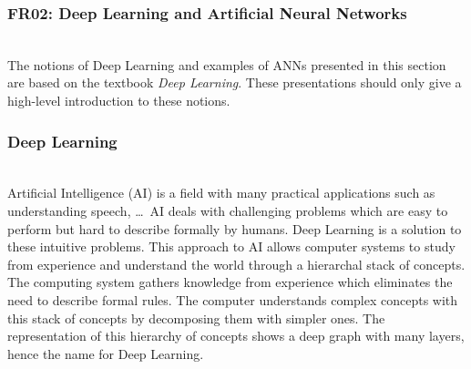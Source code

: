 
\subsubsection{FR02: Deep Learning and Artificial Neural Networks}\label{ann}~\\

The notions of Deep Learning and examples of ANNs presented in this section are
based on the textbook \textit{Deep Learning}\cite{Goodfellow-et-al-2016}. These
presentations should only give a high-level introduction to these notions.

\subsubsection{Deep Learning}~\\


Artificial Intelligence (AI) is a field with many practical applications such as
understanding speech, \dots \ AI deals with challenging problems which are easy to
perform but hard to describe formally by humans. Deep Learning is a solution to
these intuitive problems. This approach to AI allows computer systems to study
from experience and understand the world through a hierarchal stack of concepts.
The computing system gathers knowledge from experience which eliminates the need
to describe formal rules. The computer understands complex concepts with this
stack of concepts by decomposing them with simpler ones. The representation of
this hierarchy of concepts shows a deep graph with many layers, hence the name
for Deep Learning.~\cite{Goodfellow-et-al-2016}
